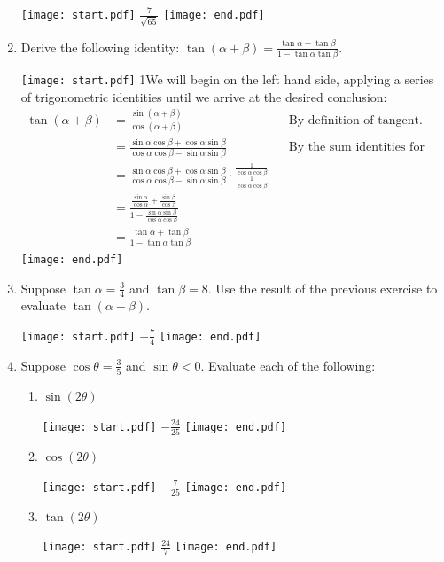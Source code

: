 \documentclass[12pt]{article}
\begin{document}
\begin{enumerate}
\texttt{[image: start.pdf]}
{$\frac{7}{\sqrt{65}}$}
\texttt{[image: end.pdf]}


\item Derive the following identity: $\tan{(\alpha+\beta)}=\frac{\tan\alpha+\tan\beta}{1-\tan\alpha\tan\beta}$.

\texttt{[image: start.pdf]}
{{1\linewidth}{We will begin on the left hand side, applying a series of trigonometric identities until we arrive at the desired conclusion:
\begin{align*}
\tan(\alpha+\beta) &=\frac{\sin(\alpha+\beta)}{\cos(\alpha+\beta)} && \text{By definition of tangent.}\\
&=\frac{\sin\alpha\cos\beta+\cos\alpha\sin\beta}{\cos\alpha\cos\beta-\sin\alpha\sin\beta} && \text{By the sum identities for sine and cosine.}\\
&=\frac{\sin\alpha\cos\beta+\cos\alpha\sin\beta}{\cos\alpha\cos\beta-\sin\alpha\sin\beta}\cdot\frac{\frac{1}{\cos\alpha\cos\beta}}{\frac{1}{\cos\alpha\cos\beta}}\\
&=\frac{\frac{\sin\alpha}{\cos\alpha}+\frac{\sin\beta}{\cos\beta}}{1-\frac{\sin\alpha\sin\beta}{\cos\alpha\cos\beta}}\\
&=\frac{\tan\alpha+\tan\beta}{1-\tan\alpha\tan\beta}
\end{align*}}}
\texttt{[image: end.pdf]}


\item Suppose $\tan\alpha=\frac{3}{4}$ and $\tan\beta=8$.  Use the result of the previous exercise to evaluate $\tan(\alpha+\beta)$.

\texttt{[image: start.pdf]}
{$-\frac{7}{4}$}
\texttt{[image: end.pdf]}


\item Suppose $\cos\theta=\frac{3}{5}$ and $\sin\theta<0$.  Evaluate each of the following:

\begin{enumerate}

\item $\sin{(2\theta)}$

\texttt{[image: start.pdf]}
{$-\frac{24}{25}$}
\texttt{[image: end.pdf]}


\item $\cos{(2\theta)}$

\texttt{[image: start.pdf]}
{$-\frac{7}{25}$}
\texttt{[image: end.pdf]}


\item $\tan{(2\theta)}$

\texttt{[image: start.pdf]}
{$\frac{24}{7}$}
\texttt{[image: end.pdf]}



\end{enumerate}
\end{enumerate}
\end{document}
